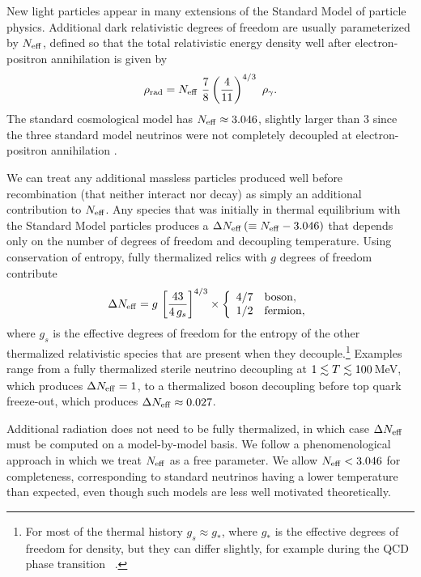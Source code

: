 \documentclass[longauth,traditabstract]{aa}
\def\,{\thinspace}
\def\lsim{\mathrel{\raise .4ex\hbox{\rlap{$<$}\lower 1.2ex\hbox{$\sim$}}}}
\let\lea=\lsim
\newcommand{\nnu}{N_{\rm eff}}
\providecommand{\lea}{\la}
\providecommand{\simlt}{\lea}
\begin{document}
New light particles appear in many extensions of the Standard Model of
particle physics.
Additional dark relativistic degrees of freedom are usually parameterized
by $\nnu$, defined so that the total relativistic energy density well after electron-positron annihilation
is given by
\begin{equation}
  \rho_{\rm rad} = \nnu\ \frac{7}{8}\left(\frac{4}{11}\right)^{4/3}
  \ \rho_\gamma.
\end{equation}
The standard cosmological model has $\nnu\approx 3.046$, slightly larger than
$3$ since the three standard model neutrinos were not completely decoupled at
electron-positron annihilation \citep{Gnedin:1998, Mangano2005,deSalas:2016ztq}.

We can treat any additional massless particles produced well before
recombination (that neither interact nor decay) as simply an additional
contribution to $\nnu$.  Any species that was initially in thermal equilibrium
with the Standard Model particles produces a $\Delta \nnu
\,(\equiv \nnu - 3.046)$ that depends only
on the number of degrees of freedom and decoupling temperature.
Using conservation of entropy, fully thermalized relics with $g$ degrees of freedom contribute
\begin{equation}
  \Delta \nnu = g\,\left[\frac{43}{4\,g_s}\right]^{4/3}\times
  \left\{ \begin{array}{cl} 4/7 & {\rm boson}, \\
                            1/2 & {\rm fermion}, \end{array} \right.
\end{equation}
where $g_s$ is the effective degrees of freedom for the entropy of the other thermalized relativistic species that are present when they decouple.\footnote{For most of the thermal history $g_s\approx g_*$, where $g_*$ is the effective degrees of freedom for density, but they can differ slightly, for example during the QCD phase transition~\citep{Borsanyi:2016ksw} .}
Examples range from a fully thermalized sterile neutrino decoupling at
$1 \simlt T \simlt 100\,$MeV, which produces $\Delta \nnu=1$, to a thermalized boson
decoupling before top quark freeze-out, which produces
$\Delta \nnu\approx 0.027$.

Additional radiation does not need to be fully thermalized, in which case
$\Delta \nnu$ must be computed on a model-by-model basis.
We follow a phenomenological approach in which we treat $\nnu$
as a free parameter.  We allow $\nnu<3.046$ for completeness, corresponding to
standard neutrinos having a lower temperature than expected,
even though such models are less well motivated theoretically.
\end{document}
